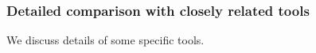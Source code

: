 





\subsubsection{Detailed comparison with closely related tools}
We discuss details of some specific tools.

